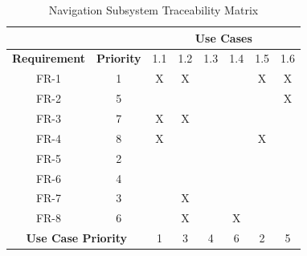 \documentclass{article}
\begin{document}
\begin{enumerate}
	
	\begin{table}[h!]
\centering
\caption{Navigation Subsystem Traceability Matrix}
\label{my-label}
\begin{tabular}{cc|c|c|c|c|c|c|}
\cline{3-8}
                                           &                   & \multicolumn{6}{c|}{\textbf{Use Cases}} \\ \hline
\multicolumn{1}{|c|}{\textbf{Requirement}} & \textbf{Priority} & 1.1  & 1.2  & 1.3  & 1.4  & 1.5  & 1.6  \\ \hline
\multicolumn{1}{|c|}{FR-1}                 & 1                 & X    & X    &      &      & X    & X    \\ \hline
\multicolumn{1}{|c|}{FR-2}                 & 5                 &      &      &      &      &      & X    \\ \hline
\multicolumn{1}{|c|}{FR-3}                 & 7                 & X    & X    &      &      &      &      \\ \hline
\multicolumn{1}{|c|}{FR-4}                 & 8                 & X    &      &      &      & X    &      \\ \hline
\multicolumn{1}{|c|}{FR-5}                 & 2                 &      &      &      &      &      &      \\ \hline
\multicolumn{1}{|c|}{FR-6}                 & 4                 &      &      &      &      &      &      \\ \hline
\multicolumn{1}{|c|}{FR-7}                 & 3                 &      & X    &      &      &      &      \\ \hline
\multicolumn{1}{|c|}{FR-8}                 & 6                 &      & X    &      & X    &      &      \\ \hline
\multicolumn{2}{|c|}{\textbf{Use Case Priority}}               & 1    & 3    & 4    & 6    & 2    & 5    \\ \hline
\end{tabular}
\end{table}




\end{enumerate}
\end{document}
